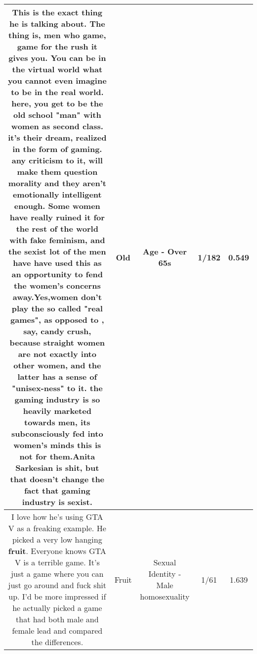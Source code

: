 \documentclass[11pt]{article}
\newlength\mylength
\begin{document}
\begin{center}
\begin{longtable}{|C{.65\mylength}|C{.30\mylength}|C{.12\mylength}|C{.12\mylength}|C{.12\mylength}|}
  \small This is the exact thing he is talking about. The thing is, men who game, game for the rush it gives you. You can be in the virtual world what you cannot even imagine to be in the real world. here, you get to be the \textbf{old} school "man" with women as second class. it's their dream, realized in the form of gaming. any criticism to it, will make them question morality and they aren't emotionally intelligent enough. Some women have really ruined it for the rest of the world with fake feminism, and  the sexist lot of the men have have used this as an opportunity to fend the women's concerns away.Yes,women don't play the so called "real games", as opposed to , say, candy crush, because straight women are not exactly into other women, and the latter has a sense of "unisex-ness" to it. the gaming industry is so heavily marketed towards men, its subconsciously fed into women's minds this is not for them.Anita Sarkesian is shit, but that doesn't change the fact that gaming industry is sexist.\normalsize   & Old & Age - Over 65s & 1/182 & 0.549 \\  \hline
  \small I love how he's using GTA V as a freaking example. He picked a very low hanging \textbf{fruit}. Everyone knows GTA V is a terrible game. It's just a game where you can just go around and fuck shit up. I'd be more impressed if he actually picked a game that had both male and female lead and compared the differences.\normalsize   & Fruit & Sexual Identity - Male homosexuality & 1/61 & 1.639 \\  \hline

\end{longtable}
\end{center}
\end{document}
